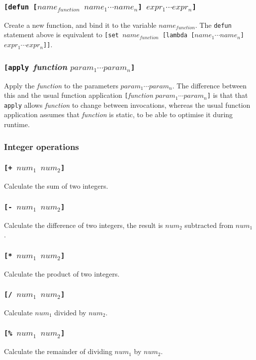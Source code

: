 \documentclass[11pt]{report}
\begin{document}
\subsubsection*{\tt{[defun [}$name_{function}$ $name_1 \cdots name_n$\tt{]} $expr_1 \cdots expr_n$\tt{]}}
Create a new function, and bind it to the variable $name_{function}$. The \verb|defun| statement above is equivalent to {\tt{[set }}$name_{function}${\tt{ [lambda [}}$name_1 \cdots name_n${\tt{]}} $expr_1 \cdots expr_n${\tt{]]}}.

\subsubsection*{{\tt{[apply }}\textnormal{\textit{function}} $param_1 \cdots param_n$\tt{]}}
Apply the \textit{function} to the parameters $param_1\cdots param_n$. The difference between this and the usual function application {{\tt{[}}\textit{function} $param_1\cdots param_n$\tt{]}} is that that \verb|apply| allows \textit{function} to change between invocations, whereas the usual function application assumes that \textit{function} is static, to be able to optimise it during runtime.

\subsubsection{Integer operations}
\subsubsection*{\tt{[+ }$num_1$ $num_2$\tt{]}}
Calculate the sum of two integers.
\subsubsection*{\tt{[- }$num_1$ $num_2$\tt{]}}
Calculate the difference of two integers, the result is $num_2$ subtracted from $num_1$.
\subsubsection*{\tt{[* }$num_1$ $num_2$\tt{]}}
Calculate the product of two integers.
\subsubsection*{\tt{[/ }$num_1$ $num_2$\tt{]}}
Calculate $num_1$ divided by $num_2$.
\subsubsection*{\tt{[\% }$num_1$ $num_2$\tt{]}}
Calculate the remainder of dividing $num_1$ by $num_2$.
\end{document}
